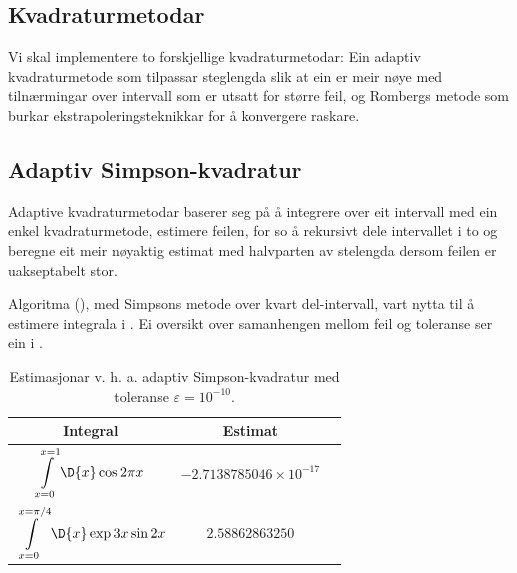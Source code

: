 \documentclass[12pt]{article}
\begin{document}
\begin{multicols}{2}

    \section{Kvadraturmetodar}
    Vi skal implementere to forskjellige kvadraturmetodar:
    Ein adaptiv kvadraturmetode som tilpassar steglengda
    slik at ein er meir nøye med tilnærmingar over intervall
    som er utsatt for større feil, og Rombergs metode
    som burkar ekstrapoleringsteknikkar for å konvergere raskare.

    \subsection{Adaptiv Simpson-kvadratur}
    Adaptive kvadraturmetodar baserer seg på å
    integrere over eit intervall med ein enkel
    kvadraturmetode,
    estimere feilen, for so å rekursivt dele intervallet
    i to og beregne eit meir nøyaktig estimat med halvparten
    av stelengda dersom feilen er uakseptabelt stor.

    Algoritma (), med
    Simpsons metode over kvart del-intervall,
    vart nytta til å estimere integrala i .
    Ei oversikt over samanhengen mellom feil og toleranse ser
    ein i .

    \begin{table}[H]
        \centering
        \caption{
            Estimasjonar v. h. a. adaptiv Simpson-kvadratur
            med toleranse $\varepsilon = 10^{-10}$.
        }
        \label{tab:simp}
        \begin{tabular}{c c c}
            \toprule
            \sc Integral & \sc Estimat \\
            \midrule
            $ \displaystyle \int\limits_{x = 0}^{x = 1} \D{x} \cos 2\pi x $ &
            $ −2.7138785046 \times 10^{−17}$ \\
            $ \displaystyle \int\limits_{x = 0}^{x = \pi/4} \D{x} \exp 3x \sin 2x $ &
            $ 2.58862863250 $ \\
            \bottomrule
        \end{tabular}
    \end{table}


\end{multicols}
\end{document}

